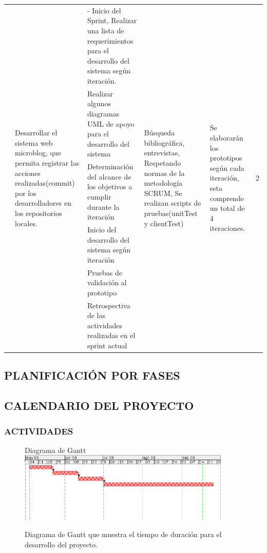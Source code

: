\begin{center}
\begin{longtable}{|p{2cm}|p{2cm}|p{3cm}|p{2cm}|p{2cm}|p{1.2cm}|}
&\multirow{6}{2cm}{Desarrollar el sistema web microblog, que permita registrar las acciones realizadas(commit) por los desarrolladores en los repositorios locales.}&{- Inicio del Sprint, Realizar una lista de requerimientos para el desarrollo del sistema según iteración.}&\multirow{6}{2cm}{Búsqueda bibliográfica, entrevistas, Respetando normas de la metodología SCRUM, Se realizan scripts de pruebas(unitTest y clientTest)}&\multirow{6}{2cm}{Se elaborarán los prototipos según cada iteración, esta comprende un total de 4 iteraciones.}&\multirow{6}{2cm}{2}\\\cline{3-3}

& &{Realizar algunos diagramas UML de apoyo para el desarrollo del sistema}&&&\\\cline{3-3}
& &{Determinación del alcance de los objetivos a cumplir durante la iteración}&&&\\\cline{3-3}
& &{Inicio del desarrollo del sistema según iteración}&&&\\\cline{3-3}
& &{Pruebas de validación al prototipo}&&&\\\cline{3-3}
& &{Retrospectiva de las actividades realizadas en el sprint actual}&&&\\
\hline
\end{longtable}
\end{center}
\subsection{PLANIFICACIÓN POR FASES}

\subsection{CALENDARIO DEL PROYECTO}

\subsubsection{ACTIVIDADES}
\begin{figure}[htb]
  Diagrama de Gantt
  \centering
  \includegraphics[width=0.9\textwidth]{imagenes/Gantt.png}%
  \caption{Diagrama de Gantt que muestra el tiempo de duración para el desarrollo del proyecto.}
  \label{contexto:figura}
\end{figure}

%
